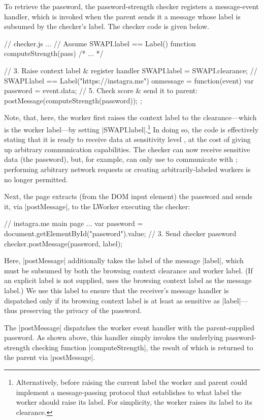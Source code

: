 To retrieve the password, the password-strength checker registers a
message-event handler, which is invoked when the parent sends it a
message whose label is subsumed by the checker's label.
%
The checker code is given below.
\begin{jscode}
// checker.js ...
// Assume SWAPI.label == Label()
function computeStrength(pass) { /* ... */ }

// 3. Raise context label & register handler
SWAPI.label = SWAPI.clearance;
// SWAPI.label == Label("https://instagra.me")
onmessage = function(event) {
  var password = event.data;
  // 5. Check score & send it to parent:
  postMessage(computeStrength(password));
};
\end{jscode}
%
Note, that, here, the worker first raises the context label to the
clearance---which is the worker label---by setting
\js|SWAPI.label|.\footnote{
  Alternatively, before raising the current label the worker and
  parent could implement a message-passing protocol that establishes
  to what label the worker should raise its label. For simplicity, the
  worker raises its label to its clearance.
}
%
In doing so, the code is effectively stating that it is ready to
receive data at sensitivity level , at the cost of
giving up arbitrary communication capabilities.
%
The checker can now receive sensitive data (the password), but, for
example, can only use \xhr{} to communicate with ;
%
performing arbitrary network requests or creating arbitrarily-labeled
workers is no longer permitted.

Next, the page extracts (from the DOM input element) the password and
sends it, via \js|postMessage|, to the LWorker executing the checker:
\begin{jscode}
// instagra.me main page ...
var password = 
 document.getElementById("password").value;
// 3. Send checker password 
checker.postMessage(password, label);
\end{jscode}
Here, \js|postMessage| additionally takes the label of the message
\js|label|, which must be subsumed by both the browsing context
clearance and worker label.
%
(If an explicit label is not supplied, \sys{} uses the browsing
context label as the message label.)
%
We use this label to ensure that the receiver's message handler is
dispatched only if its browsing context label is at least as sensitive
as \js|label|---thus preserving the privacy of the password.

The \js|postMessage| dispatches the worker event handler with the
parent-supplied password. 
%
As shown above, this handler simply invokes the underlying
password-strength checking function \js|computeStrength|, the result
of which is returned to the parent via \js|postMessage|.
%

